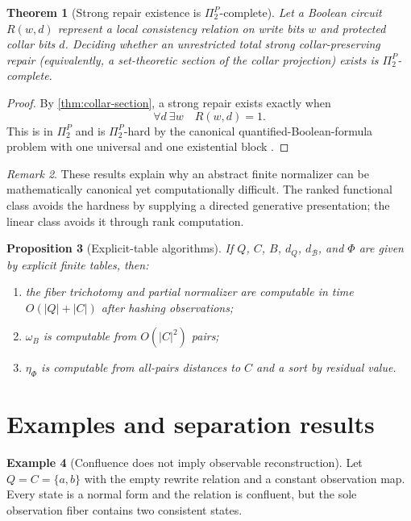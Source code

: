 \documentclass[11pt]{article}
\newtheorem{theorem}{Theorem}[section]
\newtheorem{proposition}[theorem]{Proposition}
\theoremstyle{definition}
\newtheorem{example}[theorem]{Example}
\theoremstyle{remark}
\newtheorem{remark}[theorem]{Remark}
\numberwithin{equation}{section}
\newcommand{\cB}{\mathcal B}
\begin{document}
\begin{theorem}[Strong repair existence is $\Pi_2^P$-complete]\label{thm:repair-complexity}
Let a Boolean circuit $R(w,d)$ represent a local consistency relation on write bits $w$ and protected collar bits $d$.  Deciding whether an unrestricted total strong collar-preserving repair (equivalently, a set-theoretic section of the collar projection) exists is $\Pi_2^P$-complete.
\end{theorem}

\begin{proof}
By \cref{thm:collar-section}, a strong repair exists exactly when
\[
 \forall d\ \exists w\quad R(w,d)=1.
\]
This is in $\Pi_2^P$ and is $\Pi_2^P$-hard by the canonical quantified-Boolean-formula problem with one universal and one existential block \citep{Stockmeyer1976,Papadimitriou1994}.
\end{proof}

\begin{remark}
These results explain why an abstract finite normalizer can be mathematically canonical yet computationally difficult.  The ranked functional class avoids the hardness by supplying a directed generative presentation; the linear class avoids it through rank computation.
\end{remark}

\begin{proposition}[Explicit-table algorithms]
If $Q$, $C$, $B$, $d_Q$, $d_{\cB}$, and $\Phi$ are given by explicit finite tables, then:
\begin{enumerate}[label=(\roman*)]
\item the fiber trichotomy and partial normalizer are computable in time $O(|Q|+|C|)$ after hashing observations;
\item $\omega_B$ is computable from $O(|C|^2)$ pairs;
\item $\eta_\Phi$ is computable from all-pairs distances to $C$ and a sort by residual value.
\end{enumerate}
\end{proposition}

\section{Examples and separation results}\label{sec:examples}

\begin{example}[Confluence does not imply observable reconstruction]
Let $Q=C=\{a,b\}$ with the empty rewrite relation and a constant observation map.  Every state is a normal form and the relation is confluent, but the sole observation fiber contains two consistent states.
\end{example}
\end{document}
